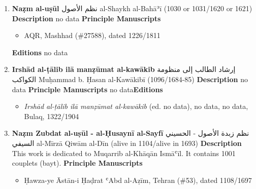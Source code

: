 \documentclass{article}
\begin{document}
\begin{enumerate}
      \item \textbf{Naẓm al-uṣūl}
        \newline
        \textarabic{نظم الأصول}
        \newline
        al-Shaykh al-Bahāʾī
        \newline
        (1030 or 1031/1620 or 1621)
        \newline
        \newline
        \textbf{Description}
        \newline	
        no data
        \newline
        \newline
    \textbf{Principle Manuscripts}
\begin{itemize}
    \item AQR, Mashhad (\#27588), dated 1226/1811
    \end{itemize}
\textbf{Editions}
\newline
no data\newline
      \item \textbf{Irshād al-ṭālib ilā manẓūmat al-kawākib}
        \newline
        \textarabic{إرشاد الطالب إلى منظومة الكواكب}
        \newline
        Muḥammad b. Ḥasan al-Kawākibī
        \newline
        (1096/1684-85)
        \newline
        \newline
        \textbf{Description}
        \newline	
        no data
        \newline
        \newline
    \textbf{Principle Manuscripts}
\newline
no data\newline\textbf{Editions}
\begin{itemize}
        \item \emph{Irshād al-ṭālib ilā manẓūmat al-kawākib} (ed. no data), no data, no data, Bulaq, 1322/1904
        \end{itemize}

      \item \textbf{Naẓm Zubdat al-uṣūl - al-Ḥusaynī al-Sayfī}
        \newline
        \textarabic{نظم زبدة الأصول - الحسيني السيفي}
        \newline
        al-Mīrzā Qiwām al-Dīn
        \newline
        (alive in 1104/alive in 1693)
        \newline
        \newline
        \textbf{Description}
        \newline	
        This work is dedicated to Muqarrib al-Khāqān Ismāʿīl. It contains 1001 couplets (bayt).
        \newline
        \newline
    \textbf{Principle Manuscripts}
\begin{itemize}
    \item Ḥawza-ye Āstān-i Ḥaḍrat ʿAbd al-Aẓīm, Tehran (\#53), dated 1108/1697
    

\end{itemize}
\end{enumerate}
\end{document}
